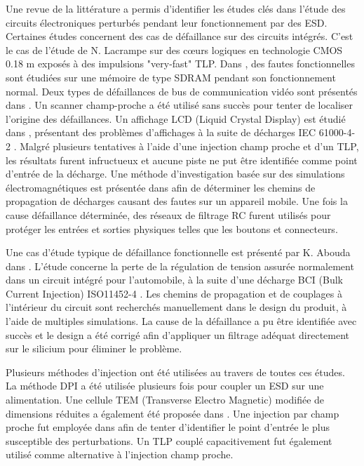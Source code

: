 Une revue de la littérature a permis d'identifier les études clés dans l'étude des circuits électroniques perturbés pendant leur fonctionnement par des ESD.
Certaines études concernent des cas de défaillance sur des circuits intégrés.
C'est le cas de l'étude de N. Lacrampe \cite{LacrampeTransientImmunity} sur des cœurs logiques en technologie CMOS 0.18 \textmu{}m exposés à des impulsions "very-fast" TLP.
Dans \cite{SDRAMCase}, des fautes fonctionnelles sont étudiées sur une mémoire de type SDRAM pendant son fonctionnement normal.
Deux types de défaillances de bus de communication vidéo sont présentés dans \cite{softFailSubsystem}.
Un scanner champ-proche a été utilisé sans succès pour tenter de localiser l'origine des défaillances.
Un affichage LCD (Liquid Crystal Display) est étudié dans \cite{softFailLCD}, présentant des problèmes d'affichages à la suite de décharges IEC 61000-4-2 \cite{iec61000-4-2}.
Malgré plusieurs tentatives à l'aide d'une injection champ proche et d'un TLP, les résultats furent infructueux et aucune piste ne put être identifiée comme point d'entrée de la décharge.
Une méthode d'investigation basée sur des simulations électromagnétiques est présentée dans \cite{softFailMobile} afin de déterminer les chemins de propagation de décharges causant des fautes sur un appareil mobile.
Une fois la cause défaillance déterminée, des réseaux de filtrage RC furent utilisés pour protéger les entrées et sorties physiques telles que les boutons et connecteurs.

Une cas d'étude typique de défaillance fonctionnelle est présenté par K. Abouda dans \cite{softfailEMCIC}.
L'étude concerne la perte de la régulation de tension assurée normalement dans un circuit intégré pour l'automobile, à la suite d'une décharge BCI (Bulk Current Injection) ISO11452-4 \cite{iso11452}.
Les chemins de propagation et de couplages à l'intérieur du circuit sont recherchés manuellement dans le design du produit, à l'aide de multiples simulations.
La cause de la défaillance a pu être identifiée avec succès et le design a été corrigé afin d'appliquer un filtrage adéquat directement sur le silicium pour éliminer le problème.

Plusieurs méthodes d'injection ont été utilisées au travers de toutes ces études.
La méthode DPI \cite{iec62132-4} a été utilisée plusieurs fois pour coupler un ESD sur une alimentation.
Une cellule TEM (Transverse Electro Magnetic) modifiée de dimensions réduites a également été proposée dans \cite{SDRAMCase}.
Une injection par champ proche fut employée dans \cite{softFailLCD} afin de tenter d'identifier le point d'entrée le plus susceptible des perturbations.
Un TLP couplé capacitivement fut également utilisé comme alternative à l'injection champ proche.


